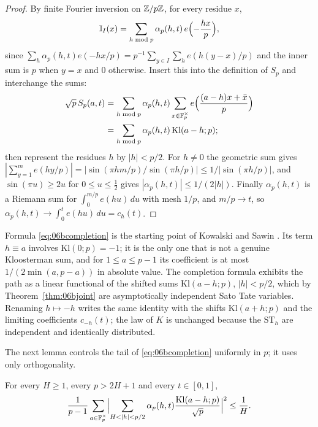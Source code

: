 \begin{proof}
By finite Fourier inversion on $\mathbb{Z}/p\mathbb{Z}$, for every residue $x$,
\[
\mathbb{I}_I(x)=\sum_{h\bmod p}\alpha_p(h,t)\,e\Bigl(-\frac{hx}{p}\Bigr),
\]
since $\sum_h\alpha_p(h,t)e(-hx/p)=p^{-1}\sum_{y\in I}\sum_he(h(y-x)/p)$ and the inner sum is $p$ when $y=x$ and $0$ otherwise. Insert this into the definition of $S_p$ and interchange the sums:
\begin{align*}
\sqrt p\,S_p(a,t)&=\sum_{h\bmod p}\alpha_p(h,t)\sum_{x\in\mathbb{F}_p^\times}e\Bigl(\frac{(a-h)x+\bar x}{p}\Bigr)\\
&=\sum_{h\bmod p}\alpha_p(h,t)\,\mathrm{Kl}(a-h;p);
\end{align*}
then represent the residues $h$ by $|h|<p/2$. For $h\ne0$ the geometric sum gives $|\sum_{y=1}^me(hy/p)|=|\sin(\pi hm/p)/\sin(\pi h/p)|\le1/|\sin(\pi h/p)|$, and $\sin(\pi u)\ge2u$ for $0\le u\le\frac12$ gives $|\alpha_p(h,t)|\le 1/(2|h|)$. Finally $\alpha_p(h,t)$ is a Riemann sum for $\int_0^{m/p}e(hu)\,du$ with mesh $1/p$, and $m/p\to t$, so $\alpha_p(h,t)\to\int_0^te(hu)\,du=c_h(t)$.
\end{proof}

Formula \eqref{eq:06bcompletion} is the starting point of Kowalski and Sawin \cite{kowalskisawin2016}. Its term $h\equiv a$ involves $\mathrm{Kl}(0;p)=-1$; it is the only one that is not a genuine Kloosterman sum, and for $1\le a\le p-1$ its coefficient is at most $1/(2\min(a,p-a))$ in absolute value. The completion formula exhibits the path as a linear functional of the shifted sums $\mathrm{Kl}(a-h;p)$, $|h|<p/2$, which by Theorem~\ref{thm:06bjoint} are asymptotically independent Sato Tate variables. Renaming $h\mapsto-h$ writes the same identity with the shifts $\mathrm{Kl}(a+h;p)$ and the limiting coefficients $c_{-h}(t)$; the law of $K$ is unchanged because the $\mathrm{ST}_h$ are independent and identically distributed.

The next lemma controls the tail of \eqref{eq:06bcompletion} uniformly in $p$; it uses only orthogonality.

\begin{lemma}\label{lem:06btail}
For every $H\ge1$, every $p>2H+1$ and every $t\in[0,1]$,
\[
\frac{1}{p-1}\sum_{a\in\mathbb{F}_p^\times}\Bigl|\sum_{H<|h|<p/2}\alpha_p(h,t)\frac{\mathrm{Kl}(a-h;p)}{\sqrt p}\Bigr|^2\le\frac1H .
\]
\end{lemma}


